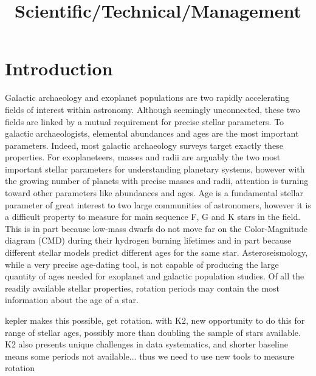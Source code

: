 \documentclass[12pt]{article}
\begin{document}


\title{Scientific/Technical/Management}
\date{}

\maketitle


\vspace{-1in}

\section{Introduction}

Galactic archaeology and exoplanet populations are two rapidly accelerating
fields of interest within astronomy.
Although seemingly unconnected, these two fields are linked by a mutual
requirement for precise stellar parameters.
To galactic archaeologists, elemental abundances and ages are the most
important parameters.
Indeed, most galactic archaeology surveys target exactly these properties.
For exoplaneteers, masses and radii are arguably the two most important
stellar parameters for understanding planetary systems, however with the
growing number of planets with precise masses and radii, attention is turning
toward other parameters like abundances and ages.
Age is a fundamental stellar parameter of great interest to two large
communities of astronomers, however it is a difficult property to measure for
main sequence F, G and K stars in the field.
This is in part because low-mass dwarfs do not move far on the Color-Magnitude
diagram (CMD) during their hydrogen burning lifetimes and in part because
different stellar models predict different ages for the same star.
Asteroseismology, while a very precise age-dating tool, is not capable of
producing the large quantity of ages needed for exoplanet and galactic
population studies.
Of all the readily available stellar properties, rotation periods may contain
the most information about the age of a star.

kepler makes this possible, get rotation. with K2, new opportunity to do this
for range of stellar ages, possibly more than doubling the sample of stars
available. K2 also presents unique challenges in data systematics, and shorter
baseline means some periods not available... thus we need to use new tools to
measure rotation
\end{document}
